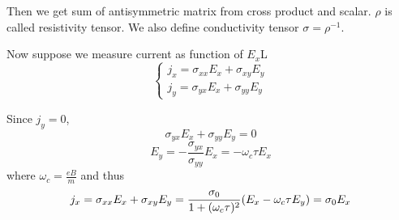  Then we get sum of antisymmetric matrix from cross product and scalar. $\rho$ is called resistivity tensor. We also define conductivity tensor $\sigma = \rho^{-1}$.
 
 Now suppose we measure current as function of $E_x$L
 $$\begin{cases}
 j_x = \sigma_{xx} E_x + \sigma_{xy} E_y\\
 j_y = \sigma_{yx} E_x + \sigma_{yy} E_y
 \end{cases}$$
 
 Since $j_y=0$,
 $$\sigma_{yx} E_x + \sigma_{yy} E_y = 0$$
 $$E_y = -\frac{\sigma_{yx}}{\sigma_{yy}} E_x = -\omega_c \tau E_x$$
 where $\omega_c = \frac{eB}{m}$ and thus
 $$j_x = \sigma_{xx} E_x + \sigma_{xy} E_y = \frac{\sigma_0}{1+(\omega_c \tau)^2} \qty(E_x - \omega_c \tau E_y) = \sigma_0 E_x$$